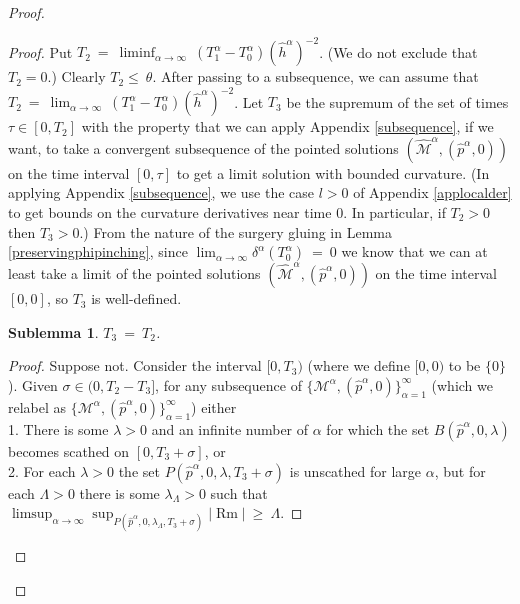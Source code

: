 \documentclass[12pt]{amsart}
\newcommand{\al}{\alpha}
\newcommand{\M}{{\mathcal M}}
\newcommand{\Rm}{\operatorname{Rm}}
\numberwithin{equation}{section}
\theoremstyle{plain}
\newtheorem{sublemma}[equation]{Sublemma}
\theoremstyle{definition}
\theoremstyle{remark}
\begin{document}
\begin{proof}
\begin{proof}
Put $T_2 \: = \: \liminf_{\al \rightarrow \infty} \: (T_1^\al - T_0^\al)(\hat{h}^\al)^{-2}$. (We do
not exclude that $T_2 = 0$.) Clearly $T_2 \le \: \theta$.
After passing to a subsequence, we can assume that
$T_2 \: = \: \lim_{\al \rightarrow \infty} \: (T_1^\al - T_0^\al)(\hat{h}^\al)^{-2}$.
Let $T_3$ be the supremum of the set of times 
$\tau \in [0, T_2]$ with the property that we can apply 
Appendix \ref{subsequence}, if we want,
to take a convergent subsequence of the pointed solutions 
$(\widehat{\M}^\al, (\hat{p}^\al,0))$ on the time interval $[0, \tau]$ to get
a limit solution with bounded curvature.
(In applying Appendix \ref{subsequence}, we use the case $l >0$ of 
Appendix \ref{applocalder} to get bounds on the
curvature derivatives near time $0$. In particular, if
$T_2 > 0$ then $T_3 > 0$.)
From the nature of the
surgery gluing in Lemma \ref{preservingphipinching},
since $\lim_{\al \rightarrow \infty} 
\delta^\al (T_0^\al) \: = \: 0$ 
we know that we can at least
take a limit of the pointed solutions 
$(\widehat{\M}^\al, (\hat{p}^\al,0))$ on the time interval $[0,0]$, 
so $T_3$ is well-defined.

\begin{sublemma}
$T_3 \: = \: T_2$.
\end{sublemma}
\begin{proof}
Suppose not. Consider the interval $[0, T_3)$ (where we define
$[0, 0)$ to be $\{0\}$).
Given $\sigma \in (0, T_2 - T_3]$, for any subsequence
of $\{\M^\al, (\hat{p}^\al,0)\}_{\al=1}^\infty$ (which we relabel as 
$\{\M^\al, (\hat{p}^\al,0)\}_{\al=1}^\infty$)
either \\
1. There is some $\lambda > 0$ and an
infinite number of $\al$
for which the set $B(\hat{p}^{\al}, 0, \lambda)$ becomes 
scathed on $[0, T_3 + \sigma]$, or \\
2. For each $\lambda > 0$ the set
$P(\hat{p}^{\al}, 0, \lambda, T_3 + \sigma)$
is unscathed for large $\al$, but for each
$\Lambda > 0$ there is some
$\lambda_\Lambda > 0$ such that 
$\limsup_{\al \rightarrow \infty} 
\sup_{P(\hat{p}^{\al}, 0, \lambda_\Lambda, T_3 + \sigma)} |\Rm| \: \ge \: \Lambda$.


\end{proof}
\end{proof}
\end{proof}
\end{document}
